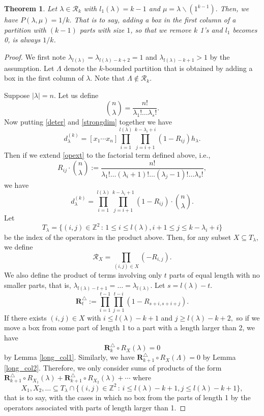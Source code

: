 \documentclass[11pt]{amsart}
\newtheorem{theorem}{Theorem}[section]
\begin{document}
\begin{theorem} \label{Thm:rate1} Let $\lambda \in \mathcal{R}_k$ with $l_1(\lambda)=k-1$ and $\mu=\lambda \backslash (1^{k-1}).$ Then, we have $P(\lambda,\mu)=1/k.$ That is to say, adding a box in the first column of a partition with $(k-1)$ parts with size $1$, so that we remove $k$ 1's and $l_1$ becomes 0, is always $1/k$.
\end{theorem}
\begin{proof}
    We first note $\lambda_{l(\lambda)}= \lambda_{l(\lambda)-k+2}=1$ and $\lambda_{l(\lambda)-k+1} >1$ by the assumption. Let $\Lambda$ denote the $k$-bounded partition that is obtained by adding a box in the first column of $\lambda.$ Note that $\Lambda \notin \mathcal{R}_k.$ 

Suppose $|\lambda|=n$. Let us define 
\[\binom{n}{\lambda}=\frac{n!}{\lambda_1! \ldots \lambda_s!}.\]
Now putting \eqref{deter} and \eqref{strongdim} together we have
\[d_{\lambda}^{(k)}=[x_1\cdots x_n]\prod_{i=1}^{l(\lambda)} \prod_{j=i+1}^{k-\lambda_i+i} (1-R_{ij}) h_{\lambda}. \]
Then if we extend \eqref{opext} to the factorial term defined above, i.e.,
\[R_{ij} \cdot\binom{n}{\lambda}:=\frac{n!}{\lambda_1! \ldots (\lambda_{i}+1)! \ldots(\lambda_j-1)! \ldots  \lambda_s!},\]
we have
\[d_{\lambda}^{(k)}=\prod_{i=1}^{l(\lambda)} \prod_{j=i+1}^{k-\lambda_i+1} (1-R_{ij}) \cdot \binom{n}{\lambda}. \]
Let 
\[T_{\lambda}=\{(i,j) \in \mathbb{Z}^2 \, : \, 1 \leq i \leq l(\lambda), i+1 \leq j \leq k-\lambda_i+i\}\]
be the index of the operators in the product above. Then, for any subset $X \subseteq T_{\lambda},$ we define
\begin{equation} \label{r_x}
    \mathcal{R}_X=\prod_{(i,j)\in X} (-R_{i,j}).
\end{equation}
We also define the product of terms involving only $t$ parts of equal length with no smaller parts, that is, 
$\lambda_{l(\lambda)-t+1}=\dots=\lambda_{l(\lambda)}$. Let $s=l(\lambda)-t$.
\begin{equation}\label{r_triangle}
    \mathbf{R}^\triangle_t:=\prod_{i=1}^{t-1}\prod_{j=1}^{t-i} (1-R_{s+i,s+i+j}).
\end{equation}
If there exists $(i,j) \in X$ with $i\leq l(\lambda)-k+1$ and  $j \geq l(\lambda)-k+2,$ so if we move a box from some part of length 1 to a part with a length larger than 2, we have
\[\mathbf{R}_{k}^{\triangle }\circ R_X (\lambda) =0\]
by Lemma \ref{long_col1}. Similarly, we have $\mathbf{R}_{k+1}^{\triangle }\circ R_X (\Lambda) =0$ by Lemma \ref{long_col2}. Therefore, we only consider sums of products of the form $\mathbf{R}_{k+1}^{\triangle }\circ R_{X_1} (\lambda)+\mathbf{R}_{k+1}^{\triangle }\circ R_{X_2} (\lambda)+\cdots$ where 
\[X_1,X_2,\ldots \subseteq T_{\lambda} \cap \{(i,j) \in \mathbb{Z}^2 \, : \,  i \leq l(\lambda)-k+1, j \leq l(\lambda)-k+1\},\]
that is to say, with the cases in which no box from the parts of length 1 by the operators associated with parts of length larger than 1. 


\end{proof}
\end{document}

